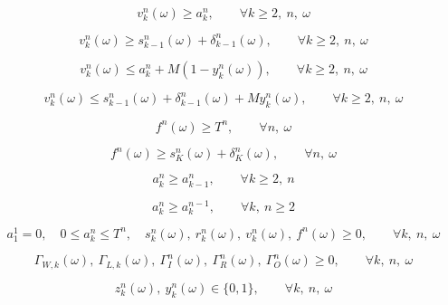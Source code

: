 \documentclass[UTF8,11pt]{ctexart}
\begin{document}
\begin{equation}
v_k^n(\omega) \ge a_k^n,
\qquad \forall k \ge 2,\ n,\ \omega
\tag{18}
\end{equation}

\begin{equation}
v_k^n(\omega) \ge s_{k-1}^n(\omega) + \delta_{k-1}^n(\omega),
\qquad \forall k \ge 2,\ n,\ \omega
\tag{19}
\end{equation}

\begin{equation}
v_k^n(\omega) \le a_k^n + M(1-y_k^n(\omega)),
\qquad \forall k \ge 2,\ n,\ \omega
\tag{20}
\end{equation}

\begin{equation}
v_k^n(\omega) \le s_{k-1}^n(\omega) + \delta_{k-1}^n(\omega) + M y_k^n(\omega),
\qquad \forall k \ge 2,\ n,\ \omega
\tag{21}
\end{equation}

\begin{equation}
f^n(\omega) \ge T^n,
\qquad \forall n,\ \omega
\tag{22}
\end{equation}

\begin{equation}
f^n(\omega) \ge s_K^n(\omega) + \delta_K^n(\omega),
\qquad \forall n,\ \omega
\tag{23}
\end{equation}

\begin{equation}
a_k^n \ge a_{k-1}^n,
\qquad \forall k \ge 2,\ n
\tag{24}
\end{equation}

\begin{equation}
a_k^n \ge a_k^{n-1},
\qquad \forall k,\ n \ge 2
\tag{25}
\end{equation}

\begin{equation}
a_1^1 = 0,\quad
0 \le a_k^n \le T^n,\quad
s_k^n(\omega),\ r_k^n(\omega),\ v_k^n(\omega),\ f^n(\omega) \ge 0,
\qquad \forall k,\ n,\ \omega
\tag{26a}
\end{equation}

\begin{equation}
\Gamma_{W,k}(\omega),\ \Gamma_{L,k}(\omega),\ \Gamma_I^n(\omega),\ \Gamma_R^n(\omega),\ \Gamma_O^n(\omega) \ge 0,
\qquad \forall k,\ n,\ \omega
\tag{26b}
\end{equation}

\begin{equation}
z_k^n(\omega),\ y_k^n(\omega) \in \{0,1\},
\qquad \forall k,\ n,\ \omega
\tag{26c}
\end{equation}
\end{document}
